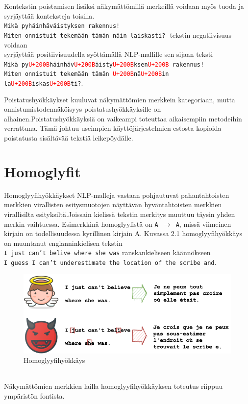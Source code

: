 Kontekstin poistamisen lisäksi näkymättömillä merkeillä voidaan myös tuoda ja syrjäyttää konteksteja toisilla.\\
\texttt{Mikä pyhäinhäväistyksen rakennus!\\
  Miten onnistuit tekemään tämän näin laiskasti?} -tekstin negatiivisuus voidaan\\
syrjäyttää positiivisuudella syöttämällä NLP-mallille sen sijaan teksti \\
\texttt{Mikä py\textcolor{red}{U+200B}häinhäv\textcolor{red}{U+200B}äisty\textcolor{red}{U+200B}ksen\textcolor{red}{U+200B} rakennus!\\
  Miten onnistuit tekemään tämän \textcolor{red}{U+200B}nä\textcolor{red}{U+200B}in la\textcolor{red}{U+200B}iskas\textcolor{red}{U+200B}ti?}. \citep{boucher2021bad}

Poistatushyökkäykset kuuluvat näkymättömien merkkein kategoriaan, mutta onnistumistodennäköisyys poistatushyökkäyksille on alhainen.Poistatushyökkäyksiä on vaikeampi toteuttaa aikaisempiin metodeihin verrattuna. Tämä johtuu useimpien käyttöjärjestelmien estosta kopioida poistatusta sisältävää tekstiä leikepöydälle. \citep{boucher2021bad}

\section{Homoglyfit}
Homoglyyfihyökkäykset NLP-malleja vastaan pohjautuvat pahantahtoisten merkkien virallisten esitysmuotojen näyttävän hyväntahtoisten merkkien virallisilta esityksiltä.Jois\-sain kielissä tekstin merkitys muuttuu täysin yhden merkin vaihtuessa. Esimerkkinä homoglyyfistä on \texttt{A $\rightarrow$ A}, missä viimeinen kirjain on todellisuudessa kyrillinen kirjain A. Kuvassa 2.1 homoglyyfihyökkäys on muuntanut englanninkielisen tekstin\\ \texttt{I just can't belive where she was} ranskankieliseen käännökseen\\ \texttt{I guess I can't underestimate the location of the scribe and}.
\begin{figure}[t]
  \includegraphics[scale=0.5]{figures/homoglyph.png}
  \caption{Homoglyyfihyökkäys \citep{boucher2021bad}}
\end{figure}
\\Näkymättömien merkkien lailla homoglyyfihyökkäyksen toteutus riippuu ympäristön fontista. \citep{boucher2021bad}


